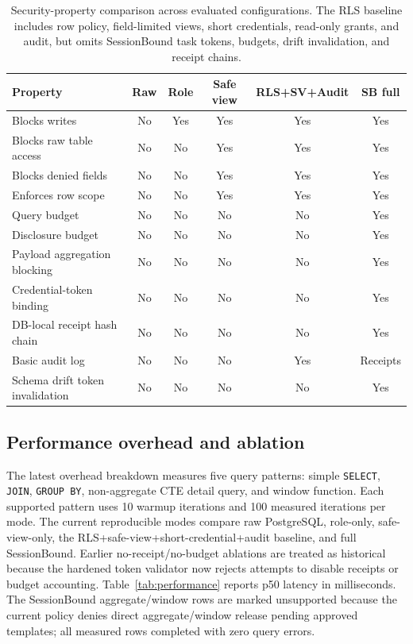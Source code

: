 \documentclass[journal]{IEEEtran}
\begin{document}
\begin{table}[!t]
\centering
\scriptsize
\setlength{\tabcolsep}{2.5pt}
\caption{Security-property comparison across evaluated configurations. The RLS baseline includes row policy, field-limited views, short credentials, read-only grants, and audit, but omits SessionBound task tokens, budgets, drift invalidation, and receipt chains.}
\label{tab:security-baselines}
\begin{tabular}{@{}lccccc@{}}
\toprule
Property & Raw & Role & Safe view & RLS+SV+Audit & SB full \\
\midrule
Blocks writes & No & Yes & Yes & Yes & Yes \\
Blocks raw table access & No & No & Yes & Yes & Yes \\
Blocks denied fields & No & No & Yes & Yes & Yes \\
Enforces row scope & No & No & Yes & Yes & Yes \\
Query budget & No & No & No & No & Yes \\
Disclosure budget & No & No & No & No & Yes \\
Payload aggregation blocking & No & No & No & No & Yes \\
Credential-token binding & No & No & No & No & Yes \\
DB-local receipt hash chain & No & No & No & No & Yes \\
Basic audit log & No & No & No & Yes & Receipts \\
Schema drift token invalidation & No & No & No & No & Yes \\
\bottomrule
\end{tabular}
\end{table}

\hypertarget{performance-overhead-and-ablation}{%
\subsection{Performance overhead and
ablation}\label{performance-overhead-and-ablation}}

The latest overhead breakdown measures five query patterns: simple
\texttt{SELECT}, \texttt{JOIN}, \texttt{GROUP\ BY}, non-aggregate CTE
detail query, and window function. Each supported pattern uses 10
warmup iterations and 100 measured iterations per mode. The current
reproducible modes compare raw PostgreSQL, role-only, safe-view-only, the
RLS+safe-view+short-credential+audit baseline, and full SessionBound.
Earlier no-receipt/no-budget ablations are treated as historical because the
hardened token validator now rejects attempts to disable receipts or budget
accounting.
Table~\ref{tab:performance} reports p50 latency in milliseconds. The
SessionBound aggregate/window rows are marked unsupported because the
current policy denies direct aggregate/window release pending approved
templates; all measured rows completed with zero query errors.
\end{document}
